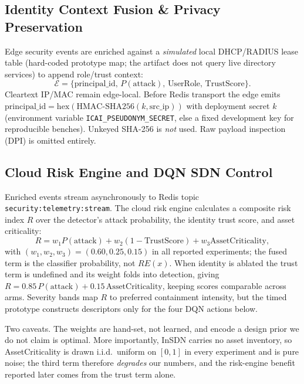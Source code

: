 \documentclass[conference,a4paper]{IEEEtran}
\begin{document}
\subsection{Identity Context Fusion \& Privacy Preservation}
Edge security events are enriched against a \emph{simulated} local DHCP/RADIUS lease table (hard-coded prototype map; the artifact does not query live directory services) to append role/trust context:
\begin{equation}
\mathcal{E} = \{ \text{principal\_id},\, P(\text{attack}),\, \text{UserRole},\, \text{TrustScore} \}.
\end{equation}
Cleartext IP/MAC remain edge-local. Before Redis transport the edge emits
$\mathrm{principal\_id}=\mathrm{hex}(\mathrm{HMAC\text{-}SHA256}(k, \mathrm{src\_ip}))$
with deployment secret $k$ (environment variable \texttt{ICAI\_PSEUDONYM\_SECRET}, else a fixed development key for reproducible benches). Unkeyed SHA-256 is \emph{not} used. Raw payload inspection (DPI) is omitted entirely.

\subsection{Cloud Risk Engine and DQN SDN Control}
Enriched events stream asynchronously to Redis topic \texttt{security:telemetry:stream}. The cloud risk engine calculates a composite risk index $R$ over the detector's attack probability, the identity trust score, and asset criticality:
\begin{equation}
R = w_1 P(\text{attack}) + w_2 (1-\text{TrustScore}) + w_3 \text{AssetCriticality},
\label{eq:risk}
\end{equation}
with $(w_1, w_2, w_3) = (0.60, 0.25, 0.15)$ in all reported experiments; the fused term is the classifier probability, not $RE(x)$. When identity is ablated the trust term is undefined and its weight folds into detection, giving $R = 0.85\,P(\text{attack}) + 0.15\,\text{AssetCriticality}$, keeping scores comparable across arms. Severity bands map $R$ to preferred containment intensity, but the timed prototype constructs descriptors only for the four DQN actions below.

Two caveats. The weights are hand-set, not learned, and encode a design prior we do not claim is optimal. More importantly, InSDN carries no asset inventory, so AssetCriticality is drawn i.i.d.\ uniform on $[0,1]$ in every experiment and is pure noise; the third term therefore \emph{degrades} our numbers, and the risk-engine benefit reported later comes from the trust term alone.
\end{document}
